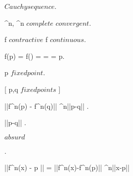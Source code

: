 \documentclass[../Main/main]{subfiles}
\begin{document}
{{{			 $ Cauchy sequence $.

			 \subset \R^n, \R^n $ complete $ \imp {} $ convergent $.

			f $ contractive $ \imp f $ continuous$.

			f(p) = f() =  =  = p.

			p $ fixed point $.

			[ p,q $ fixed points $ ]
			{
				||f^n(p) - f^n(q)|| \leq \lambda^n||p-q|| .

				||p-q|| .

				$absurd$
			}.

			{
				||f^n(x) - p || = ||f^n(x)-f^n(p)|| \leq \lambda^n||x-p|| 
			}
		}
	}
	
	
	
	
	
	
	
	
}
\end{document}
